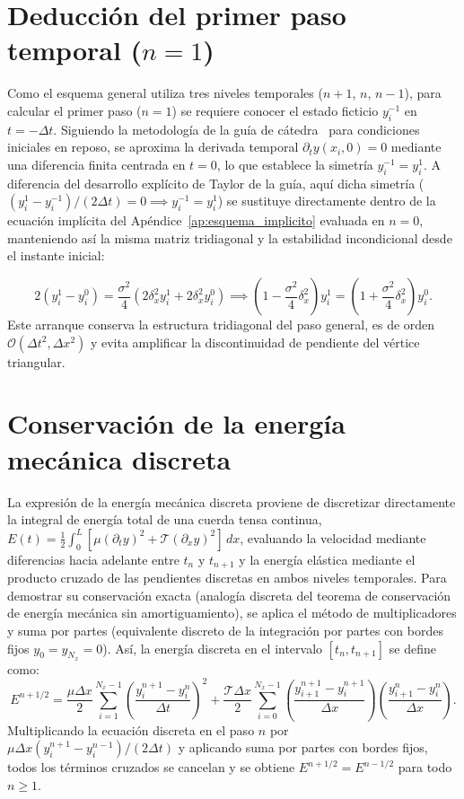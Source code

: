 \documentclass[11pt,a4paper]{article}
\begin{document}
\section{Deducción del primer paso temporal ($n = 1$)}
\label{ap:primer_paso}
Como el esquema general utiliza tres niveles temporales ($n+1$, $n$, $n-1$), para calcular el primer paso ($n=1$) se requiere conocer el estado ficticio $y_i^{-1}$ en $t = -\Delta t$. Siguiendo la metodología de la guía de cátedra~\cite{gutierrez} para condiciones iniciales en reposo, se aproxima la derivada temporal $\partial_t y(x_i, 0) = 0$ mediante una diferencia finita centrada en $t = 0$, lo que establece la simetría $y_i^{-1} = y_i^1$. A diferencia del desarrollo explícito de Taylor de la guía, aquí dicha simetría ($(y_i^1 - y_i^{-1})/(2\Delta t) = 0 \implies y_i^{-1} = y_i^1$) se sustituye directamente dentro de la ecuación implícita del Apéndice~\ref{ap:esquema_implicito} evaluada en $n=0$, manteniendo así la misma matriz tridiagonal y la estabilidad incondicional desde el instante inicial:

\begin{equation}
2(y_i^1 - y_i^0) = \frac{\sigma^2}{4}\left(2\delta_x^2 y_i^1 + 2\delta_x^2 y_i^0\right) \implies \left(1 - \frac{\sigma^2}{4}\delta_x^2\right)y_i^1 = \left(1 + \frac{\sigma^2}{4}\delta_x^2\right)y_i^0.
\end{equation}
Este arranque conserva la estructura tridiagonal del paso general, es de orden $\mathcal{O}(\Delta t^2, \Delta x^2)$ y evita amplificar la discontinuidad de pendiente del vértice triangular.
\section{Conservación de la energía mecánica discreta}
\label{ap:energia_discreta}
La expresión de la energía mecánica discreta proviene de discretizar directamente la integral de energía total de una cuerda tensa continua, $E(t) = \frac{1}{2}\int_0^L [\mu(\partial_t y)^2 + \mathcal{T}(\partial_x y)^2]\,dx$, evaluando la velocidad mediante diferencias hacia adelante entre $t_n$ y $t_{n+1}$ y la energía elástica mediante el producto cruzado de las pendientes discretas en ambos niveles temporales. Para demostrar su conservación exacta (analogía discreta del teorema de conservación de energía mecánica sin amortiguamiento), se aplica el método de multiplicadores y suma por partes (equivalente discreto de la integración por partes con bordes fijos $y_0 = y_{N_x} = 0$). Así, la energía discreta en el intervalo $[t_n, t_{n+1}]$ se define como:
\begin{equation}
E^{n+1/2} = \frac{\mu\Delta x}{2}\sum_{i=1}^{N_x-1}\left(\frac{y_i^{n+1}-y_i^n}{\Delta t}\right)^2 + \frac{\mathcal{T}\Delta x}{2}\sum_{i=0}^{N_x-1}\left(\frac{y_{i+1}^{n+1}-y_i^{n+1}}{\Delta x}\right)\left(\frac{y_{i+1}^n-y_i^n}{\Delta x}\right).
\end{equation}
Multiplicando la ecuación discreta en el paso $n$ por $\mu\Delta x (y_i^{n+1} - y_i^{n-1})/(2\Delta t)$ y aplicando suma por partes con bordes fijos, todos los términos cruzados se cancelan y se obtiene $E^{n+1/2} = E^{n-1/2}$ para todo $n \ge 1$.
\end{document}
